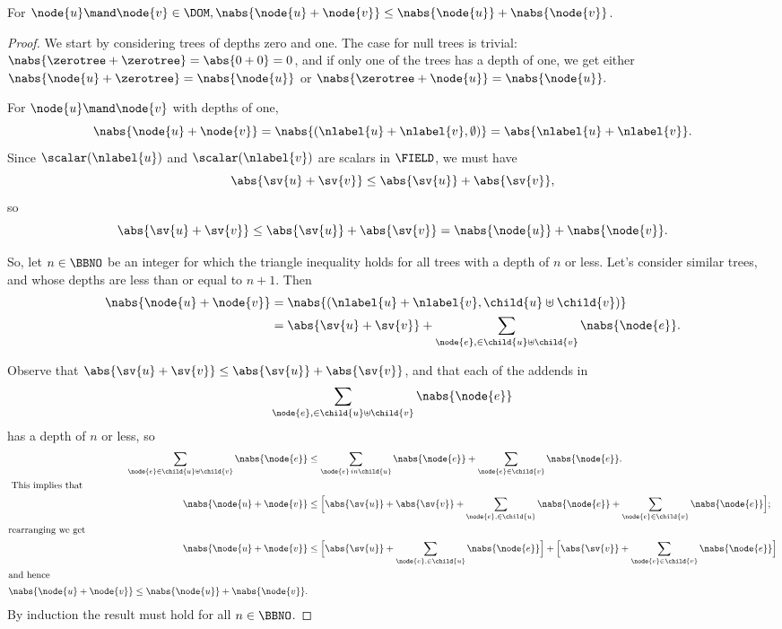 \begin{proposition}\label{triangle1}
  For $\node{u} \mand \node{v} \in \DOM, \nabs{\node{u} + \node{v}}
  \leq \nabs{\node{u}} + \nabs{\node{v}}$.

  \begin{proof}
    We start by considering trees of depths zero and one. The case for null trees is trivial: $\nabs{\zerotree +
      \zerotree} = \abs{0 + 0} = 0$, and if only one of the trees has a depth of one, we get either $\nabs{\node{u} +
      \zerotree} = \nabs{\node{u}}$ or $\nabs{\zerotree + \node{u}} = \nabs{\node{u}}.$

    For $\node{u} \mand \node{v}$  with depths of one, \[\nabs{\node{u} + \node{v}} = \nabs{(\nlabel{u}+\nlabel{v}, \emptyset)}= \abs{\nlabel{u}+\nlabel{v}}.\]
    Since $\scalar(\nlabel{u})$ and $\scalar(\nlabel{v})$ are scalars in $\FIELD$, we must have
    \[\abs{\sv{u} + \sv{v}} \leq \abs{\sv{u}}+\abs{\sv{v}},\]
    so \[\abs{\sv{u}+\sv{v}} \leq \abs{\sv{u}}+\abs{\sv{v}} = \nabs{\node{u}} + \nabs{\node{v}}.\]

    So, let $n\in\BBNO$ be an integer for which the triangle inequality holds for all
    trees with a depth of $n$ or less.  Let's consider similar trees,  and  whose depths are less
    than or equal to $n+1$. Then
    \begin{align*}
      \nabs{\node{u} + \node{v}} &= \nabs{(\nlabel{u} + \nlabel{v}, \child{u}\uplus\child{v})} \\
      &= \abs{\sv{u} + \sv{v}} + \sum_{\node{e},\in{\child{u}\uplus\child{v}}}\nabs{\node{e}}.
    \end{align*}

    Observe that $\abs{\sv{u} + \sv{v}} \leq \abs{\sv{u}} + \abs{\sv{v}}$, and that each 
    of the addends in \[\sum_{\node{e},\in{\child{u}\uplus\child{v}}}\nabs{\node{e}}\] has a depth of $n$ or
    less, so 
    \begin{align*}
      \sum_{\node{e}\in{\child{u}\uplus\child{v}}}\nabs{\node{e}} &\leq \sum_{\node{e}\,in{\child{u}}}\nabs{\node{e}} + \sum_{\node{e}\in\child{v}}\nabs{\node{e}}.\\
      \intertext{ This implies that}
      \nabs{\node{u} + \node{v}} &\leq \Bigl[\abs{\sv{u}} + \abs{\sv{v}} + \sum_{\node{e},\in\child{u}}\nabs{\node{e}} + \sum_{\node{e}\in\child{v}}\nabs{\node{e}}\Bigr];\\
      \intertext{rearranging we get}
      \nabs{\node{u} + \node{v}}  &\leq \Bigl[\abs{\sv{u}} + \sum_{\node{e},\in\child{u}}\nabs{\node{e}}\Bigr] + \Bigl[\abs{\sv{v}} + \sum_{\node{e}\in\child{v}}\nabs{\node{e}}\Bigr] \\
      \intertext{and hence}
      \nabs{\node{u} + \node{v}} \leq \nabs{\node{u}} + \nabs{\node{v}}.
    \end{align*}
    By induction the result must hold for all $n\in\BBNO$.
  \end{proof}
\end{proposition}

